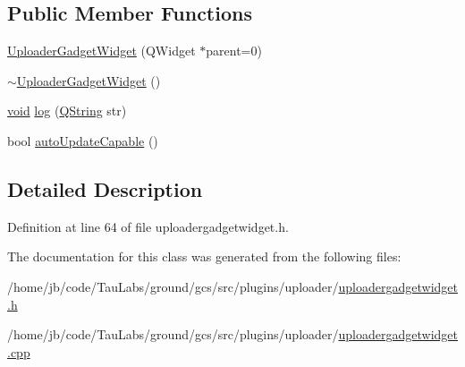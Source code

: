\subsection*{\-Public \-Member \-Functions}
\begin{DoxyCompactItemize}
\item 
\hyperlink{group___y_modem_uploader_ga7065a066176fac2b996efaea8fc29a36}{\-Uploader\-Gadget\-Widget} (\-Q\-Widget $\ast$parent=0)
\item 
\hyperlink{group___y_modem_uploader_ga81ab4c8e328f917680b38093e9c69e6c}{$\sim$\-Uploader\-Gadget\-Widget} ()
\item 
\hyperlink{group___u_a_v_objects_plugin_ga444cf2ff3f0ecbe028adce838d373f5c}{void} \hyperlink{group___y_modem_uploader_ga9927716b91171f296e3a3210e372e702}{log} (\hyperlink{group___u_a_v_objects_plugin_gab9d252f49c333c94a72f97ce3105a32d}{\-Q\-String} str)
\item 
bool \hyperlink{group___y_modem_uploader_gab177e7f52b6bfc0de4547c2e37ca9c56}{auto\-Update\-Capable} ()
\end{DoxyCompactItemize}


\subsection{\-Detailed \-Description}


\-Definition at line 64 of file uploadergadgetwidget.\-h.



\-The documentation for this class was generated from the following files\-:\begin{DoxyCompactItemize}
\item 
/home/jb/code/\-Tau\-Labs/ground/gcs/src/plugins/uploader/\hyperlink{uploadergadgetwidget_8h}{uploadergadgetwidget.\-h}\item 
/home/jb/code/\-Tau\-Labs/ground/gcs/src/plugins/uploader/\hyperlink{uploadergadgetwidget_8cpp}{uploadergadgetwidget.\-cpp}\end{DoxyCompactItemize}
